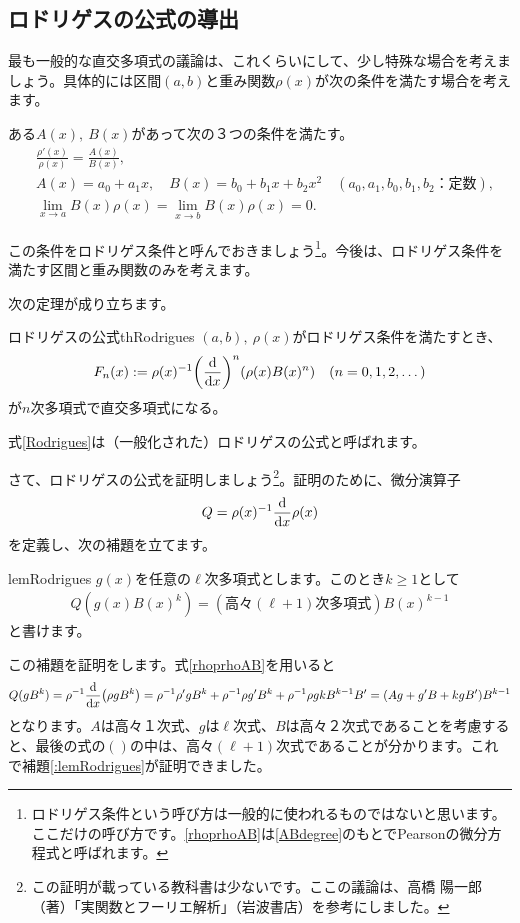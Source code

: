 \documentclass[report,paper=a4, fontsize=12pt, line_length=16cm, number_of_lines=33,dvipdfmx]{jlreq}
\newenvironment{myquote}{\begin{tcolorbox}[
  colback = blue!5, after = \noindent] }{\end{tcolorbox}}
\numberwithin{equation}{section}
\begin{document}
\subsection{ロドリゲスの公式の導出}
最も一般的な直交多項式の議論は、これくらいにして、少し特殊な場合を考えましょう。具体的には区間$(a,b)$と重み関数$\rho(x)$が次の条件を満たす場合を考えます。
\begin{myquote}
ある$A(x),\ B(x)$があって次の３つの条件を満たす。
\begin{align}
 & \frac{\rho'(x)}{\rho(x)}=\frac{A(x)}{B(x)},\label{rhoprhoAB}\\
 & A(x)=a_0+a_1 x,\quad B(x)=b_0+b_1x + b_2 x^2\quad (a_0,a_1,b_0,b_1,b_2\text{：定数}),\label{ABdegree}\\
 & \lim_{x\to a}B(x)\rho(x)=\lim_{x\to b}B(x)\rho(x)=0.\label{surface}
\end{align}
\end{myquote}
この条件をロドリゲス条件と呼んでおきましょう\footnote{ロドリゲス条件という呼び方は一般的に使われるものではないと思います。ここだけの呼び方です。\eqref{rhoprhoAB}は\eqref{ABdegree}のもとでPearsonの微分方程式と呼ばれます。}。今後は、ロドリゲス条件を満たす区間と重み関数のみを考えます。

次の定理が成り立ちます。
\begin{theor}{ロドリゲスの公式}{thRodrigues}
$(a,b),\ \rho(x)$がロドリゲス条件を満たすとき、
\begin{align}
  F_n(x):=\rho(x)^{-1}\qty(\dv{x})^n\qty(\rho(x)B(x)^n)\quad (n=0,1,2,\dots)\label{Rodrigues}
\end{align}  
が$n$次多項式で直交多項式になる。
\end{theor}
式\eqref{Rodrigues}は（一般化された）ロドリゲスの公式と呼ばれます。

さて、ロドリゲスの公式を証明しましょう\footnote{この証明が載っている教科書は少ないです。ここの議論は、高橋 陽一郎（著）「実関数とフーリエ解析」（岩波書店）を参考にしました。}。証明のために、微分演算子
\begin{align}
  Q=\rho(x)^{-1}\dv{x} \rho(x)\label{RodriguesQ}
\end{align}
を定義し、次の補題を立てます。
\begin{lemma}{}{lemRodrigues}
  $g(x)$を任意の$\ell$次多項式とします。このとき$k\ge 1$として
  \begin{align}
    Q(g(x)B(x)^{k})=(\text{高々}(\ell+1)\text{次多項式})B(x)^{k-1}
  \end{align}
  と書けます。
\end{lemma}
この補題を証明をします。式\eqref{rhoprhoAB}を用いると
\begin{align}
  Q(g B^{k})=\rho^{-1}\dv{x}(\rho g B^k)
  =\rho^{-1}\rho' g B^k+ \rho^{-1}\rho g' B^k+\rho^{-1}\rho g kB^{k-1}B'
  =(Ag+g'B+kgB')B^{k-1}
\end{align}
となります。$A$は高々１次式、$g$は$\ell$次式、$B$は高々２次式であることを考慮すると、最後の式の$()$の中は、高々$(\ell+1)$次式であることが分かります。これで補題\ref{:lemRodrigues}が証明できました。
\end{document}
